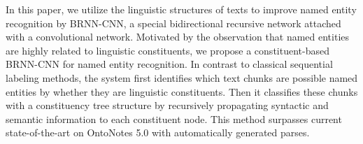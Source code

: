 In this paper, we utilize the linguistic structures of texts to improve named entity recognition by BRNN-CNN, a special bidirectional recursive network attached with a convolutional network. Motivated by the observation that named entities are highly related to linguistic constituents, we propose a constituent-based BRNN-CNN for named entity recognition. In contrast to classical sequential labeling methods, the system first identifies which text chunks are possible named entities by whether they are linguistic constituents. Then it classifies these chunks with a constituency tree structure by recursively propagating syntactic and semantic information to each constituent node. This method surpasses current state-of-the-art on OntoNotes 5.0 with automatically generated parses.

